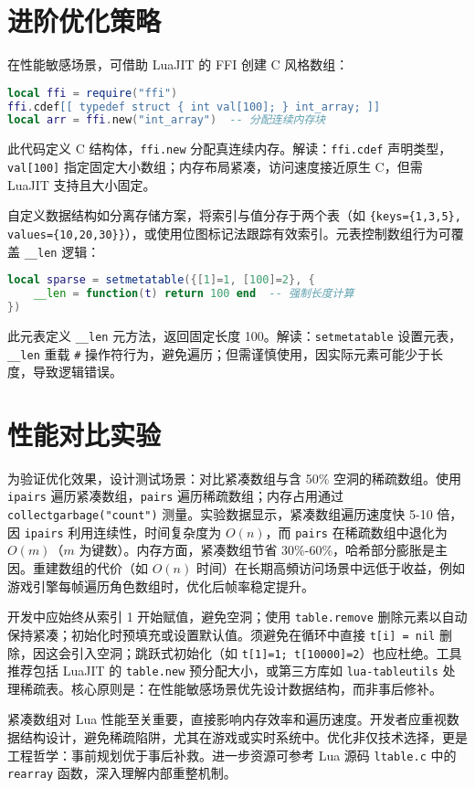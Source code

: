 \chapter{进阶优化策略}
在性能敏感场景，可借助 LuaJIT 的 FFI 创建 C 风格数组：\par
\begin{lstlisting}[language=lua]
local ffi = require("ffi")
ffi.cdef[[ typedef struct { int val[100]; } int_array; ]]
local arr = ffi.new("int_array")  -- 分配连续内存块
\end{lstlisting}
此代码定义 C 结构体，\texttt{ffi.new} 分配真连续内存。解读：\texttt{ffi.cdef} 声明类型，\texttt{val[100]} 指定固定大小数组；内存布局紧凑，访问速度接近原生 C，但需 LuaJIT 支持且大小固定。\par
自定义数据结构如分离存储方案，将索引与值分存于两个表（如 \texttt{\{{}keys=\{{}1,3,5\}{}, values=\{{}10,20,30\}{}\}{}}），或使用位图标记法跟踪有效索引。元表控制数组行为可覆盖 \texttt{\_{}\_{}len} 逻辑：\par
\begin{lstlisting}[language=lua]
local sparse = setmetatable({[1]=1, [100]=2}, {
    __len = function(t) return 100 end  -- 强制长度计算
})
\end{lstlisting}
此元表定义 \texttt{\_{}\_{}len} 元方法，返回固定长度 100。解读：\texttt{setmetatable} 设置元表，\texttt{\_{}\_{}len} 重载 \texttt{\#{}} 操作符行为，避免遍历；但需谨慎使用，因实际元素可能少于长度，导致逻辑错误。\par
\chapter{性能对比实验}
为验证优化效果，设计测试场景：对比紧凑数组与含 50\%{} 空洞的稀疏数组。使用 \texttt{ipairs} 遍历紧凑数组，\texttt{pairs} 遍历稀疏数组；内存占用通过 \texttt{collectgarbage("count")} 测量。实验数据显示，紧凑数组遍历速度快 5-10 倍，因 \texttt{ipairs} 利用连续性，时间复杂度为 $O(n)$，而 \texttt{pairs} 在稀疏数组中退化为 $O(m)$（$m$ 为键数）。内存方面，紧凑数组节省 30\%{}-60\%{}，哈希部分膨胀是主因。重建数组的代价（如 $O(n)$ 时间）在长期高頻访问场景中远低于收益，例如游戏引擎每帧遍历角色数组时，优化后帧率稳定提升。\par
开发中应始终从索引 1 开始赋值，避免空洞；使用 \texttt{table.remove} 删除元素以自动保持紧凑；初始化时预填充或设置默认值。须避免在循环中直接 \texttt{t[i] = nil} 删除，因这会引入空洞；跳跃式初始化（如 \texttt{t[1]=1; t[10000]=2}）也应杜绝。工具推荐包括 LuaJIT 的 \texttt{table.new} 预分配大小，或第三方库如 \texttt{lua-tableutils} 处理稀疏表。核心原则是：在性能敏感场景优先设计数据结构，而非事后修补。\par
紧凑数组对 Lua 性能至关重要，直接影响内存效率和遍历速度。开发者应重视数据结构设计，避免稀疏陷阱，尤其在游戏或实时系统中。优化非仅技术选择，更是工程哲学：事前规划优于事后补救。进一步资源可参考 Lua 源码 \texttt{ltable.c} 中的 \texttt{rearray} 函数，深入理解内部重整机制。\par
